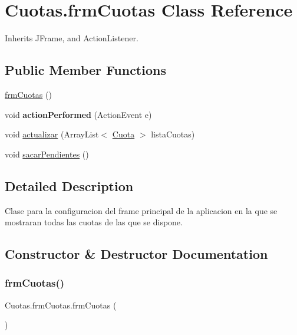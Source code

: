 \hypertarget{class_cuotas_1_1frm_cuotas}{}\section{Cuotas.\+frm\+Cuotas Class Reference}
\label{class_cuotas_1_1frm_cuotas}


Inherits J\+Frame, and Action\+Listener.

\subsection*{Public Member Functions}
\begin{DoxyCompactItemize}
\item 
\hyperlink{class_cuotas_1_1frm_cuotas_afac57838522a55786c131a93db6e20ce}{frm\+Cuotas} ()
\item 
\mbox{\label{class_cuotas_1_1frm_cuotas_a3000dcbaad7bb62b7df235987188ead4}} 
void {\bfseries action\+Performed} (Action\+Event e)
\item 
void \hyperlink{class_cuotas_1_1frm_cuotas_ad7151dc2288e0444968ac6ea359ceac5}{actualizar} (Array\+List$<$ \hyperlink{class_cuotas_1_1_cuota}{Cuota} $>$ lista\+Cuotas)
\item 
void \hyperlink{class_cuotas_1_1frm_cuotas_ab5b5e9c75b186b55c01cb2bd783efad3}{sacar\+Pendientes} ()
\end{DoxyCompactItemize}


\subsection{Detailed Description}
Clase para la configuracion del frame principal de la aplicacion en la que se mostraran todas las cuotas de las que se dispone. 

\subsection{Constructor \& Destructor Documentation}
\mbox{\label{class_cuotas_1_1frm_cuotas_afac57838522a55786c131a93db6e20ce}} 
\subsubsection{\texorpdfstring{frm\+Cuotas()}{frmCuotas()}}
{\footnotesize\ttfamily Cuotas.\+frm\+Cuotas.\+frm\+Cuotas (\begin{DoxyParamCaption}{ }\end{DoxyParamCaption})}

